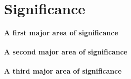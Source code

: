 \section{Significance}

\paragraph{A first major area of significance}

\lipsum[1-2]

\lipsum[3-3]

\paragraph{A second major area of significance}

\lipsum[4-5]

\paragraph{A third major area of significance}

\lipsum[6-10]
